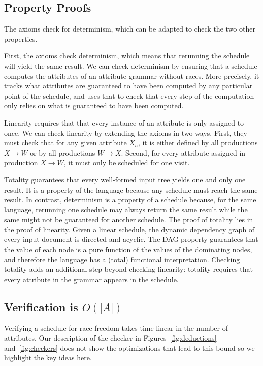 \subsection{Property Proofs}
The axioms check for determinism, which can be adapted to check the two other properties.

First, the axioms check determinism, which means that rerunning the schedule will yield the same result.  We can check determinism by ensuring that a schedule computes the attributes of an attribute grammar without races. More precisely, it tracks what attributes are guaranteed to have been computed by any particular point of the schedule, and uses that to check that every step of the computation only relies on what is guaranteed to have been computed.

Linearity requires that that every instance of an attribute is only assigned to once. We can check linearity by extending the axioms in two ways. First, they must check that for any given attribute $X_a$, it is either defined by all productions $X \rightarrow W$ or by all productions $W \rightarrow X$. Second, for every attribute assigned in production $X \rightarrow W$, it must only be scheduled for one visit. 

Totality guarantees that every well-formed input tree yields one and only one result. It is a property of the language because any schedule must reach the same result. In contrast, determinism is a property of a schedule because, for the same language, rerunning one schedule may always return the same result while the same might not be guaranteed for another schedule. The proof of totality lies in the proof of linearity. Given a linear schedule, the dynamic dependency graph of every input document is directed and acyclic. The DAG property guarantees that the value of each node is a pure function of the values of the dominating nodes, and therefore the language has a (total) functional interpretation. Checking totality adds an additional step beyond checking linearity: totality requires that every attribute in the grammar appears in the schedule.

\subsection{Verification is $O(|A|)$}
Verifying a schedule for race-freedom takes time linear in the number of attributes. Our  description of the checker in Figures~\ref{fig:deductions} and~\ref{fig:checkers} does not show the optimizations that lead to this bound so we highlight the key ideas here.


